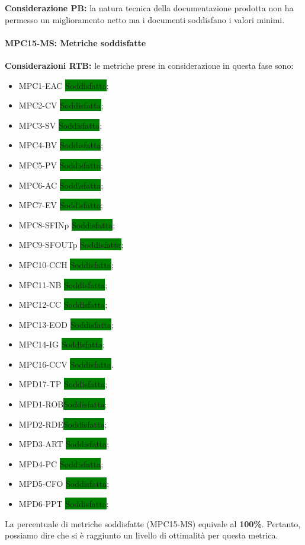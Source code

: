 \vspace{0.5cm}
\noindent \textbf{Considerazione PB:} la natura tecnica della documentazione prodotta non ha permesso un miglioramento netto ma i documenti soddisfano i valori minimi.

\paragraph{MPC15-MS: Metriche soddisfatte} \label{sec:accertamento delle qualita}

\noindent \textbf{Considerazioni RTB:}
le metriche prese in considerazione in questa fase sono:
\begin{itemize}
    \item MPC1-EAC \colorbox{green}{Soddisfatta};
    \item MPC2-CV \colorbox{green}{Soddisfatta};
    \item MPC3-SV \colorbox{green}{Soddisfatta};
    \item MPC4-BV \colorbox{green}{Soddisfatta};
    \item MPC5-PV \colorbox{green}{Soddisfatta};
    \item MPC6-AC \colorbox{green}{Soddisfatta};
    \item MPC7-EV \colorbox{green}{Soddisfatta};
    \item MPC8-SFINp \colorbox{green}{Soddisfatta};
    \item MPC9-SFOUTp \colorbox{green}{Soddisfatta};
    \item MPC10-CCH \colorbox{green}{Soddisfatta};
    \item MPC11-NB \colorbox{green}{Soddisfatta};
    \item MPC12-CC \colorbox{green}{Soddisfatta};
    \item MPC13-EOD \colorbox{green}{Soddisfatta};
    \item MPC14-IG \colorbox{green}{Soddisfatta};
    \item MPC16-CCV \colorbox{green}{Soddisfatta}.
    \item MPD17-TP \colorbox{green}{Soddisfatta};
    \item MPD1-ROB\colorbox{green}{Soddisfatta};
    \item MPD2-RDE\colorbox{green}{Soddisfatta};
    \item MPD3-ART \colorbox{green}{Soddisfatta};
    \item MPD4-PC \colorbox{green}{Soddisfatta};
    \item MPD5-CFO \colorbox{green}{Soddisfatta};
    \item MPD6-PPT \colorbox{green}{Soddisfatta};
\end{itemize}
\noindent La percentuale di metriche soddisfatte (MPC15-MS) equivale al \textbf{100\%}. Pertanto, possiamo dire che si è raggiunto un livello di ottimalità per questa metrica.

